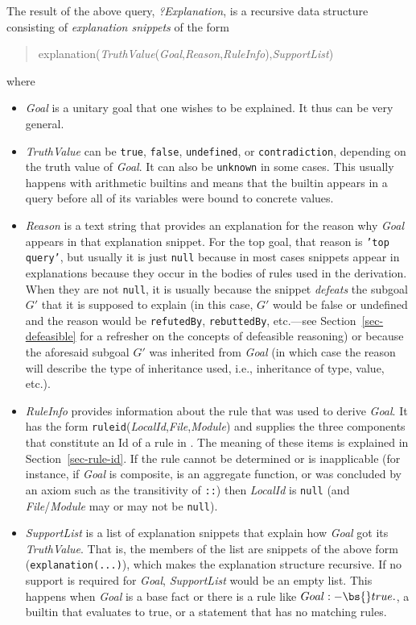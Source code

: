\begin{itemize}
  The result of the above query,
  \emph{?Explanation}, is
  a recursive data structure consisting of \emph{explanation snippets} of
  the form  
  \begin{quote}
   explanation(\emph{TruthValue}(\emph{Goal},\emph{Reason},\emph{RuleInfo}),\emph{SupportList}) 
  \end{quote}
  where
  \begin{itemize}
  \item \emph{Goal} is a unitary goal that one wishes to be explained. 
    It thus can be very general.
  \item   \emph{TruthValue} can be \texttt{true}, \texttt{false},  
    \texttt{undefined}, or \texttt{contradiction}, depending on the     
    truth value of \emph{Goal}. 
    It can also be \texttt{unknown} in some cases. This usually happens with
    arithmetic builtins and means that the builtin appears in a query before
    all of its variables were bound to concrete values. 
  \item \emph{Reason} is a text string that provides an explanation for the
    reason why \emph{Goal} appears in that explanation snippet.  For the
    top goal, that reason is \texttt{'top query'}, but usually it is just
    \texttt{null} because in most cases snippets appear in explanations   
    because they occur in the bodies of rules used in the derivation.
    When they are not \texttt{null}, it is usually because the snippet 
    \emph{defeats} the subgoal $G'$ that it is supposed to
    explain (in this case, $G'$ would be false or undefined and
    the reason would be \texttt{refutedBy},
    \texttt{rebuttedBy}, etc.---see Section~\ref{sec-defeasible} for a
    refresher on the concepts of defeasible reasoning)
    or because the aforesaid subgoal $G'$
    was inherited from \emph{Goal}
    (in which case the reason will describe
    the type of inheritance used, i.e., inheritance of type, value, etc.).
  \item \emph{RuleInfo} provides information about the rule that was used
    to derive \emph{Goal}. It has the form
    \texttt{ruleid}(\emph{LocalId},\emph{File},\emph{Module}) and supplies
    the three components that constitute an Id of a rule in \ERGO.
    The meaning of these items is explained in Section~\ref{sec-rule-id}.
    If the rule cannot be determined or is inapplicable (for instance, if
    \emph{Goal} is composite, is an aggregate function, or was concluded by
    an axiom such as the transitivity of \texttt{::}) then \emph{LocalId}
    is \texttt{null} (and \emph{File}/\emph{Module} may or may not be
    \texttt{null}).       
  \item \emph{SupportList} is a list of explanation snippets that explain
    how \emph{Goal} got its \emph{TruthValue}. That is, the members of the
    list are snippets of the above form (\texttt{explanation(...)}), which makes the explanation
    structure recursive. If no support is required for \emph{Goal},
    \emph{SupportList} would be an empty list. This happens when
    \emph{Goal} is a base fact or there is a rule like $Goal :- \bs{}true.$, a builtin that evaluates to true,
    or a statement that has no matching rules.


\end{itemize}
\end{itemize}
